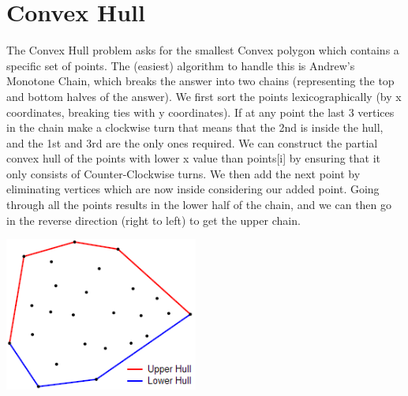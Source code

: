 \documentclass[10pt]{book}
\newif\iftodos
\newcommand{\todo}[1]{\iftodos\textcolor{red}{[TODO: #1]}\fi}
\begin{document}
  \todo{Lines/rays (point +
  vector).  Line intersection. Segment intersection.} \todo{law of cosines.}

\section{Convex Hull}
The Convex Hull problem asks for the smallest Convex polygon which contains a specific set of points. The (easiest) algorithm to handle this is Andrew's Monotone Chain, which breaks the answer into two chains (representing the top and bottom halves of the answer). We first sort the points lexicographically (by x coordinates, breaking ties with y coordinates). If at any point the last 3 vertices in the chain make a clockwise turn that means that the 2nd is inside the hull, and the 1st and 3rd are the only ones required. We can construct the partial convex hull of the points with lower x value than points[i] by ensuring that it only consists of Counter-Clockwise turns. We then add the next point by eliminating vertices which are now inside considering our added point. Going through all the points results in the lower half of the chain, and we can then go in the reverse direction (right to left) to get the upper chain.

\begin{center}
\includegraphics[width=2.5in]{images/UpperAndLowerConvexHulls.png}
\end{center}
\end{document}
